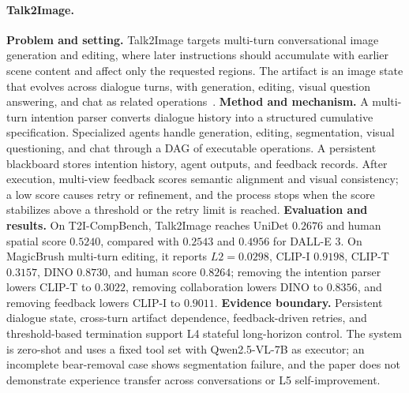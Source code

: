 \paragraph{Talk2Image.}
\textbf{Problem and setting.} Talk2Image targets multi-turn conversational image generation and editing, where later instructions should accumulate with earlier scene content and affect only the requested regions. The artifact is an image state that evolves across dialogue turns, with generation, editing, visual question answering, and chat as related operations~\cite{avg250806916}. \textbf{Method and mechanism.} A multi-turn intention parser converts dialogue history into a structured cumulative specification. Specialized agents handle generation, editing, segmentation, visual questioning, and chat through a DAG of executable operations. A persistent blackboard stores intention history, agent outputs, and feedback records. After execution, multi-view feedback scores semantic alignment and visual consistency; a low score causes retry or refinement, and the process stops when the score stabilizes above a threshold or the retry limit is reached. \textbf{Evaluation and results.} On T2I-CompBench, Talk2Image reaches UniDet $0.2676$ and human spatial score $0.5240$, compared with $0.2543$ and $0.4956$ for DALL-E 3. On MagicBrush multi-turn editing, it reports $L2=0.0298$, CLIP-I $0.9198$, CLIP-T $0.3157$, DINO $0.8730$, and human score $0.8264$; removing the intention parser lowers CLIP-T to $0.3022$, removing collaboration lowers DINO to $0.8356$, and removing feedback lowers CLIP-I to $0.9011$. \textbf{Evidence boundary.} Persistent dialogue state, cross-turn artifact dependence, feedback-driven retries, and threshold-based termination support L4 stateful long-horizon control. The system is zero-shot and uses a fixed tool set with Qwen2.5-VL-7B as executor; an incomplete bear-removal case shows segmentation failure, and the paper does not demonstrate experience transfer across conversations or L5 self-improvement.

